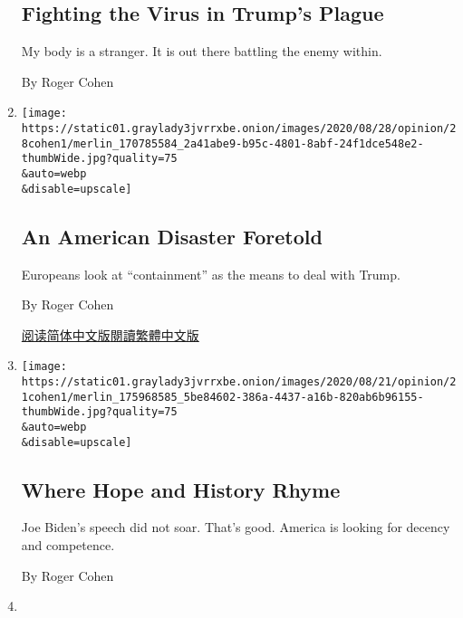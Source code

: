 \begin{enumerate}
  \hypertarget{fighting-the-virus-in-trumps-plague}{%
  \subsection{Fighting the Virus in Trump's
  Plague}\label{fighting-the-virus-in-trumps-plague}}

  My body is a stranger. It is out there battling the enemy within.

  By Roger Cohen
\item
  \href{/2020/08/28/opinion/donald-trump-europe-china.html}{}

  \texttt{[image: https://static01.graylady3jvrrxbe.onion/images/2020/08/28/opinion/28cohen1/merlin\_170785584\_2a41abe9-b95c-4801-8abf-24f1dce548e2-thumbWide.jpg?quality=75\\\&auto=webp\\\&disable=upscale]}

  \hypertarget{an-american-disaster-foretold}{%
  \subsection{An American Disaster
  Foretold}\label{an-american-disaster-foretold}}

  Europeans look at ``containment'' as the means to deal with Trump.

  By Roger Cohen

  \href{https://cn.nytimes3xbfgragh.onion/opinion/20200901/donald-trump-europe-china/}{阅读简体中文版}\href{https://cn.nytimes3xbfgragh.onion/opinion/20200901/donald-trump-europe-china/zh-hant/}{閱讀繁體中文版}
\item
  \href{/2020/08/21/opinion/biden-convention-speech.html}{}

  \texttt{[image: https://static01.graylady3jvrrxbe.onion/images/2020/08/21/opinion/21cohen1/merlin\_175968585\_5be84602-386a-4437-a16b-820ab6b96155-thumbWide.jpg?quality=75\\\&auto=webp\\\&disable=upscale]}

  \hypertarget{where-hope-and-history-rhyme}{%
  \subsection{Where Hope and History
  Rhyme}\label{where-hope-and-history-rhyme}}

  Joe Biden's speech did not soar. That's good. America is looking for
  decency and competence.

  By Roger Cohen
\item
  \href{/2020/08/14/opinion/italy-coronavirus.html}{}


\end{enumerate}
